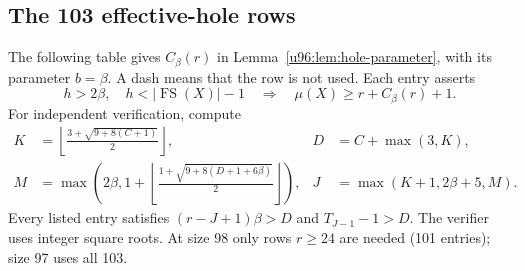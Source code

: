 \documentclass[11pt,a4paper]{article}
\theoremstyle{remark}
\newcommand{\FS}{\operatorname{FS}}
\begin{document}
\subsection{The 103 effective-hole rows}
The following table gives $C_\beta(r)$ in
Lemma~\ref{u96:lem:hole-parameter}, with its parameter $b=\beta$.
A dash means that the row is not used. Each entry asserts
\[
 h>2\beta,\quad h<|\FS(X)|-1
 \quad\Longrightarrow\quad \mu(X)\geq r+C_\beta(r)+1.
\]
For independent verification, compute
\begin{align*}
 K&=\left\lfloor\frac{3+\sqrt{9+8(C+1)}}2\right\rfloor,
 &D&=C+\max(3,K),\\
 M&=\max\left(2\beta,
       1+\left\lfloor\frac{1+\sqrt{9+8(D+1+6\beta)}}2\right\rfloor\right),
 &J&=\max(K+1,2\beta+5,M).
\end{align*}
Every listed entry satisfies $(r-J+1)\beta>D$ and $T_{J-1}-1>D$.
The verifier uses integer square roots. At size 98 only rows $r\geq24$
are needed (101 entries); size 97 uses all 103.
\end{document}
